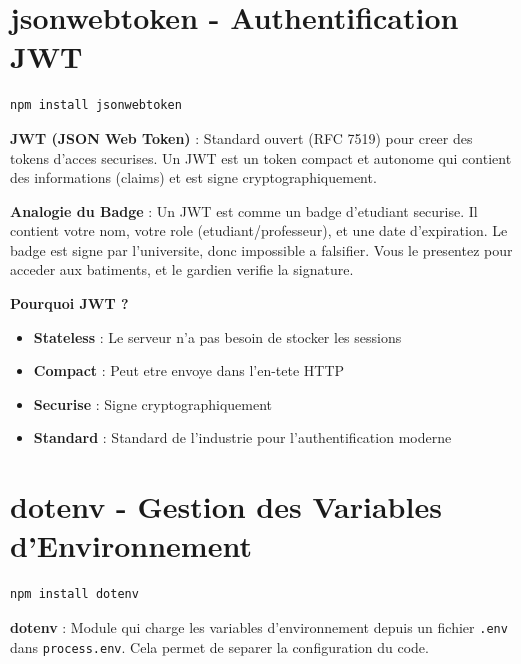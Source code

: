 \documentclass[a4paper,12pt]{book}
\begin{document}
\section{jsonwebtoken - Authentification JWT}

\begin{lstlisting}[style=bash, caption=Installation de jsonwebtoken]
npm install jsonwebtoken
\end{lstlisting}

\begin{definitionbox}
    \textbf{JWT (JSON Web Token)} : Standard ouvert (RFC 7519) pour creer des tokens d'acces securises. Un JWT est un token compact et autonome qui contient des informations (claims) et est signe cryptographiquement.
\end{definitionbox}

\begin{analogybox}
    \textbf{Analogie du Badge} : Un JWT est comme un badge d'etudiant securise. Il contient votre nom, votre role (etudiant/professeur), et une date d'expiration. Le badge est signe par l'universite, donc impossible a falsifier. Vous le presentez pour acceder aux batiments, et le gardien verifie la signature.
\end{analogybox}

\textbf{Pourquoi JWT ?}
\begin{itemize}
    \item \textbf{Stateless} : Le serveur n'a pas besoin de stocker les sessions
    \item \textbf{Compact} : Peut etre envoye dans l'en-tete HTTP
    \item \textbf{Securise} : Signe cryptographiquement
    \item \textbf{Standard} : Standard de l'industrie pour l'authentification moderne
\end{itemize}

\section{dotenv - Gestion des Variables d'Environnement}

\begin{lstlisting}[style=bash, caption=Installation de dotenv]
npm install dotenv
\end{lstlisting}

\begin{definitionbox}
    \textbf{dotenv} : Module qui charge les variables d'environnement depuis un fichier \texttt{.env} dans \texttt{process.env}. Cela permet de separer la configuration du code.
\end{definitionbox}
\end{document}
